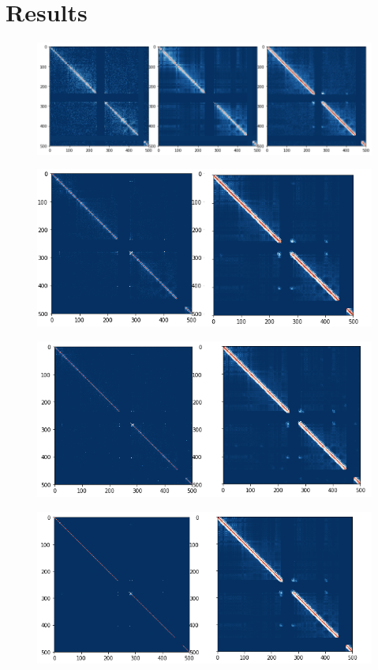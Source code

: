 \documentclass{article}
\begin{document}
\section{Results}
\begin{figure}[H]
    \centering
    \includegraphics[width=\textwidth]{mit.png}
    \caption{}
\end{figure}
\begin{figure}[H]
    \centering
    \includegraphics[width=\textwidth]{all.png}
    \caption{}
\end{figure}
\begin{figure}[H]
    \centering
    \includegraphics[width=\textwidth]{rl.png}
    \caption{}
\end{figure}
\begin{figure}[H]
    \centering
    \includegraphics[width=\textwidth]{call4.png}
    \caption{}
\end{figure}
\end{document}
